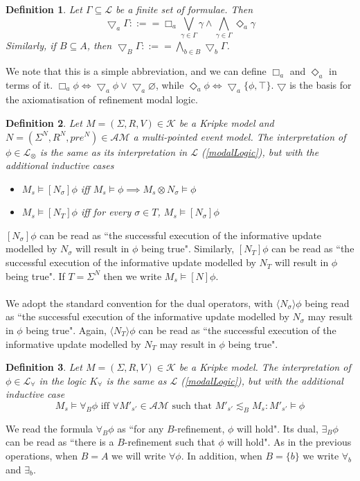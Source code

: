 \documentclass[12pt, a4paper, titlepage]{scrartcl}
\newtheorem{defn}{Definition}[subsection]
\numberwithin{equation}{section}
\newcommand{\cover}{\bigtriangledown}
\newcommand{\sqex}[1]{[{#1}]}
\newcommand{\anex}[1]{\langle {#1} \rangle}
\newcommand{\lang}{\mathcal{L}}
\newcommand{\langRefine}{\lang_{\forall}}
\newcommand{\langActEx}{\lang_{\otimes}}
\newcommand{\kripkeClass}{\mathcal{K}}
\newcommand{\eventClass}{\mathcal{AM}}
\newcommand{\FIXME}{{\bf FIXME}}
\begin{document}
\begin{defn} \label{coverDef}
Let $\Gamma \subseteq \lang$ be a finite set of formulae.
Then
\[
  \cover_a \Gamma ::== \Box_a \bigvee_{\gamma \in \Gamma} \gamma \land
  \bigwedge_{\gamma \in \Gamma} \Diamond_a \gamma
\]
Similarly, if $B \subseteq A$, then $\cover_B \Gamma ::== \bigwedge_{b \in B}
\cover_b \Gamma$.
\end{defn}
We note that this is a simple abbreviation, and we can define $\Box_a$ and
$\Diamond_a$ in terms of it.
$\Box_a \phi \iff \cover_a \phi \lor \cover_a \varnothing$, while $\Diamond_a
\phi \iff \cover_a \{\phi, \top\}$.
$\cover$ is the basis for the axiomatisation of refinement modal logic.

\begin{defn} \label{actModelLogic}
Let $M = (\Sigma, R, V) \in \kripkeClass$ be a Kripke model and $N = (\Sigma^N, R^N, pre^N) \in
\eventClass$ a multi-pointed event model.
The interpretation of $\phi \in \langActEx$ is the same as its interpretation in $\lang$
(\ref{modalLogic}), but with the additional
inductive cases
\begin{itemize}
	\item $M_s \models \sqex{N_\sigma} \phi$ iff $M_s \models \phi \implies M_s \otimes N_\sigma \models
	\phi$
	\item $M_s \models \sqex{N_T} \phi$ iff for every $\sigma \in T$, $M_s \models \sqex{N_\sigma} \phi$ 
\end{itemize}
\end{defn}
$\sqex{N_\sigma} \phi$ can be read as ``the successful execution of the informative update modelled by
$N_\sigma$ will result in $\phi$ being true".
Similarly, $\sqex{N_T} \phi$ can be read as ``the successful execution of the informative update
modelled by $N_T$ will result in $\phi$ being true".
If $T = \Sigma^N$ then we write $M_s \models \sqex{N} \phi$.\\
\\
We adopt the standard convention for the dual operators, with $\anex{ N_\sigma } \phi$ being
read as ``the successful execution of the informative update modelled by $N_\sigma$ may result in
$\phi$ being true".
Again, $\anex{ N_T } \phi$ can be read as ``the successful execution of the informative
update modelled by $N_T$ may result in $\phi$ being true".


\begin{defn} \label{refineLogic}
Let $M = (\Sigma, R, V) \in \kripkeClass$ be a Kripke model.
The interpretation of $\phi \in \langRefine$ in the logic $K_\forall$ is the same as $\lang$
(\ref{modalLogic}), but with the additional inductive case
\[
	M_s \models \forall_B \phi \text{ iff } \forall M'_{s'} \in \eventClass \text{ such that } M'_{s'}
	\lesssim_B M_s : M'_{s'} \models \phi
\]
\end{defn}
We read the formula $\forall_B \phi$ as ``for any $B$-refinement, $\phi$ will hold".
Its dual, $\exists_B \phi$ can be read as ``there is a $B$-refinement such that $\phi$ will hold".
As in the previous operations, when $B = A$ we will write $\forall \phi$.
In addition, when $B = \{b\}$ we write $\forall_b$ and $\exists_b$.
\end{document}
